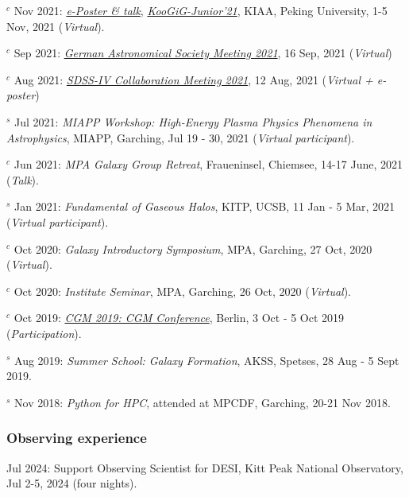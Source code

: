 \documentclass[12pt,letterpaper]{article}
\begin{document}
\begin{list}{}{\cvlist}
\item $^c$ Nov 2021:  \emph{\href{https://www.bilibili.com/video/BV1nv411M7w3}{e-Poster \& talk}}, \emph{\href{https://kiaa.pku.edu.cn/KooGig_junior21/Home.htm}{KooGiG-Junior'21}}, KIAA, Peking University, 1-5 Nov, 2021 (\textit{Virtual}).

\item $^c$ Sep 2021:  \emph{\href{https://ag2021.astronomische-gesellschaft.de/view_splinter.php?session=Stars}{German Astronomical Society Meeting 2021}}, 16 Sep, 2021 (\textit{Virtual})
\item $^c$ Aug 2021:  \emph{\href{https://jhu2021.sdss.org/}{SDSS-IV Collaboration Meeting 2021}}, 12 Aug, 2021 (\textit{Virtual + e-poster})
\item $^s$ Jul 2021:  \emph{MIAPP Workshop: High-Energy Plasma Physics Phenomena in Astrophysics}, MIAPP, Garching, Jul 19 - 30, 2021 (\textit{Virtual participant}).

\item $^c$ Jun 2021:  \emph{MPA Galaxy Group Retreat}, Fraueninsel, Chiemsee, 14-17 June, 2021 (\textit{Talk}).
\item $^s$ Jan 2021:  \emph{Fundamental of Gaseous Halos}, KITP, UCSB, 11 Jan - 5 Mar, 2021 (\textit{Virtual participant}).
\item $^c$ Oct 2020:  \emph{Galaxy Introductory Symposium}, MPA, Garching, 27 Oct, 2020 (\textit{Virtual}).
\item $^c$ Oct 2020:  \emph{Institute Seminar}, MPA, Garching, 26 Oct, 2020 (\textit{Virtual}).

\item $^c$ Oct 2019:  \emph{\href{https://wwwmpa.mpa-garching.mpg.de/conf/berlincgm2019/}{CGM 2019: CGM Conference}}, Berlin, 3 Oct - 5 Oct 2019 (\textit{Participation}).
\item $^s$ Aug 2019:  \emph{Summer School: Galaxy Formation}, AKSS, Spetses, 28 Aug - 5 Sept 2019.
\item $^s$ Nov 2018:  \emph{Python for HPC}, attended at MPCDF, Garching, 20-21 Nov 2018.
\end{list}

 \subsubsection{Observing experience}
  \begin{list}{}{\cvlist}
  \item Jul 2024: Support Observing Scientist for DESI, Kitt Peak National Observatory, Jul 2-5, 2024 (four nights).
  \end{list}
\end{document}
